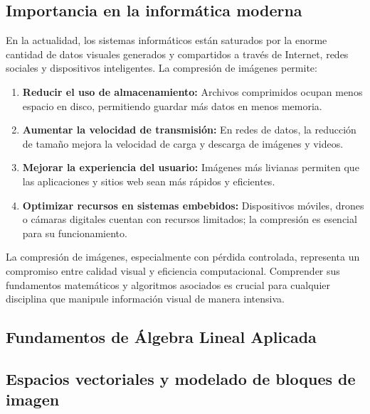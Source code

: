 \documentclass[8pt,a4paper]{article}
\theoremstyle{definition}
\theoremstyle{remark}
\begin{document}
\begin{multicols}{2}
        \subsection{Importancia en la informática moderna}

            En la actualidad, los sistemas informáticos están saturados por la enorme cantidad de datos visuales generados y compartidos a través de Internet, redes sociales y dispositivos inteligentes. La compresión de imágenes permite:
            
            \begin{enumerate}
                \item \textbf{Reducir el uso de almacenamiento:} Archivos comprimidos ocupan menos espacio en disco, permitiendo guardar más datos en menos memoria.
                
                \item \textbf{Aumentar la velocidad de transmisión:} En redes de datos, la reducción de tamaño mejora la velocidad de carga y descarga de imágenes y videos.
                
                \item \textbf{Mejorar la experiencia del usuario:} Imágenes más livianas permiten que las aplicaciones y sitios web sean más rápidos y eficientes.
                
                \item \textbf{Optimizar recursos en sistemas embebidos:} Dispositivos móviles, drones o cámaras digitales cuentan con recursos limitados; la compresión es esencial para su funcionamiento.
            \end{enumerate}
            
            La compresión de imágenes, especialmente con pérdida controlada, representa un compromiso entre calidad visual y eficiencia computacional. Comprender sus fundamentos matemáticos y algoritmos asociados es crucial para cualquier disciplina que manipule información visual de manera intensiva.


    \begin{center}
    \section{Fundamentos de Álgebra Lineal Aplicada}
    \end{center}
        
        \subsection{Espacios vectoriales y modelado de bloques de imagen}
            

\end{multicols}
\end{document}
